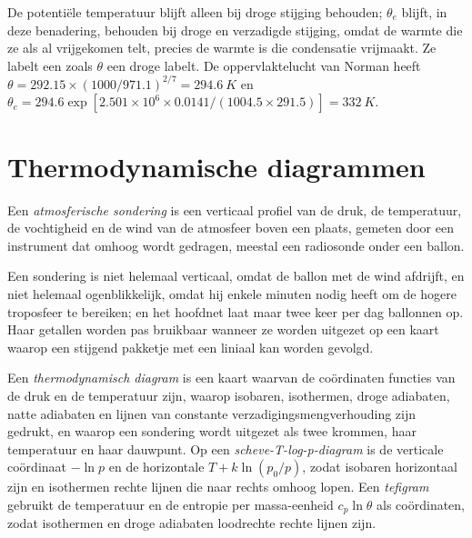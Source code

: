 De potentiële temperatuur blijft alleen bij droge stijging behouden; $\theta_e$ blijft, in deze
benadering, behouden bij droge en verzadigde stijging, omdat de warmte die ze als al vrijgekomen telt,
precies de warmte is die condensatie vrijmaakt. Ze labelt een  zoals $\theta$ een droge labelt.
De oppervlaktelucht van Norman heeft $\theta = 292.15 \times (1000/971.1)^{2/7} = \qty{294.6}{K}$ en
$\theta_e = 294.6 \exp[2.501 \times 10^6 \times 0.0141/(1004.5 \times 291.5)] = \qty{332}{K}$.

\section{Thermodynamische diagrammen}\label{sec:b2:atmospheric-thermodynamics:diagrams}

\begin{definition}\label{def:b2:atmospheric-thermodynamics:sounding}
Een \emph{atmosferische sondering} is een verticaal profiel van de
druk, de temperatuur, de vochtigheid en de wind van de atmosfeer boven een plaats, gemeten door een
instrument dat omhoog wordt gedragen, meestal een radiosonde onder een ballon.
\end{definition}

Een sondering is niet helemaal verticaal, omdat de ballon met de wind afdrijft, en niet helemaal
ogenblikkelijk, omdat hij enkele minuten nodig heeft om de hogere troposfeer te bereiken; en het
hoofdnet laat maar twee keer per dag ballonnen op. Haar getallen worden pas bruikbaar wanneer ze worden uitgezet op een kaart
waarop een stijgend pakketje met een liniaal kan worden gevolgd.

\begin{definition}\label{def:b2:atmospheric-thermodynamics:diagram}
Een \emph{thermodynamisch diagram} is een kaart waarvan de coördinaten
functies van de druk en de temperatuur zijn, waarop isobaren, isothermen, droge adiabaten, natte
adiabaten en lijnen van constante verzadigingsmengverhouding zijn gedrukt, en waarop een sondering
wordt uitgezet als twee krommen, haar temperatuur en haar dauwpunt. Op een
\emph{scheve-T-log-p-diagram} is de verticale coördinaat $-\ln p$ en de horizontale
$T + k\ln(p_0/p)$, zodat isobaren horizontaal zijn en isothermen rechte lijnen die naar rechts omhoog
lopen. Een \emph{tefigram} gebruikt de temperatuur en de entropie per
massa-eenheid $c_p\ln\theta$ als coördinaten, zodat isothermen en droge adiabaten loodrechte rechte
lijnen zijn.
\end{definition}

